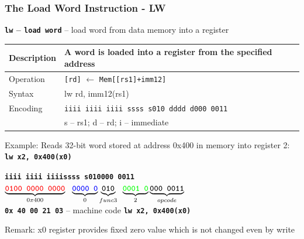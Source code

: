 \documentclass{beamer}
\begin{document}
\begin{frame}
\frametitle{The Load Word Instruction - LW}

\textbf{\texttt{lw} -- \texttt{load word}} -- load word from data memory into a register

\begin{tabular}{|l|l|}\hline
Description & A word is loaded into a register from the specified address \\ \hline
Operation & \texttt{[rd]} $\leftarrow$ \texttt{Mem[[rs1]+imm12]} \\ \hline
Syntax & lw rd, imm12(rs1) \\ \hline
Encoding & \texttt{iiii iiii iiii ssss s010 dddd d000 0011} \\ \hline
 & s -- rs1; d -- rd; i -- immediate \\ \hline
\end{tabular}

\bigskip

Example: Reads 32-bit word stored at address 0x400 in memory into register 2:\\
\textbf{\texttt{lw x2, 0x400(x0)}}

\textbf{\texttt{\color{red}iiii iiii iiii}}\phantom{xx}\textbf{\texttt{\color{blue}ssss s}}\hspace{0.1cm}\textbf{\texttt{010\hspace{0.05cm}000 0011}}\\
$\underbrace{\textbf{\texttt{\color{red}0100 0000 0000}}}_{0x400}\texttt{ }\underbrace{\textbf{\texttt{\color{blue}0000 0}}}_{0}\underbrace{\textbf{\texttt{010}}}_{func3}\phantom{i}\underbrace{\textbf{\texttt{\color{green}0001 0}}}_{2}\underbrace{\textbf{\texttt{000 0011}}}_{opcode}$\\

\textbf{\texttt{0x 40 00 21 03}} -- machine code \textbf{\texttt{lw x2, 0x400(x0)}}

Remark: x0 register provides fixed zero value which is not changed even by write

\end{frame}
\end{document}
